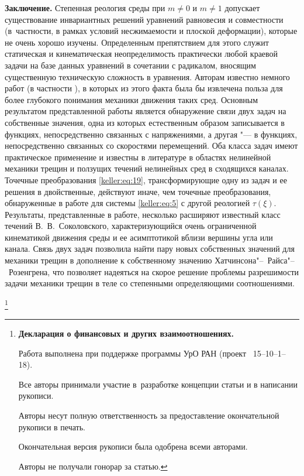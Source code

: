 {\bf Заключение.} Степенная реология среды при $m\neq0$ и $m\neq1$ допускает существование инвариантных решений уравнений равновесия и совместности (в~частности, в рамках условий несжимаемости и плоской деформации), которые не очень хорошо изучены. Определенным препятствием для этого служит статическая и кинематическая неопределимость практически любой краевой задачи на базе данных уравнений в сочетании с радикалом, вносящим существенную техническую сложность в уравнения. Авторам известно немного работ (в частности \cite{keller:bib:Dush}), в которых из этого факта была бы извлечена польза для более глубокого понимания механики движения таких сред. Основным результатом представленной работы является обнаружение связи двух задач на собственные значения, одна из которых естественным образом записывается в функциях, непосредственно связанных с напряжениями, а другая "--- в функциях, непосредственно связанных со скоростями перемещений. Оба класса задач имеют практическое применение и известны в литературе в областях нелинейной механики трещин и ползущих течений нелинейных сред в сходящихся каналах. Точечные преобразования \eqref{keller:eq:19}, трансформирующие одну из задач и ее решения в двойственные, действуют иначе, чем точечные преобразования, обнаруженные в работе \cite{keller:bib:Kel} для системы \eqref{keller:eq:5} с другой реологией $\tau(\xi).$ Результаты, представленные в работе, несколько расширяют известный класс течений В.~В.~Соколовского, характеризующийся очень ограниченной кинематикой движения среды и ее асимптотикой вблизи вершины угла или канала. Связь двух задач позволила найти пару новых собственных значений для механики трещин в дополнение к собственному значению Хатчинсона"--~Райса"--~Розенгрена, что позволяет надеяться на скорое решение проблемы разрешимости задачи механики трещин в теле со степенными определяющими соотношениями.   









\thanks{{\bf Декларация о финансовых и других взаимоотношениях.}

Работа выполнена при поддержке программы УрО РАН (проект \No~15--10--1--18).

Все  авторы  принимали  участие  в~разработке  концепции  \mbox{статьи}  и  в  написании  рукописи. 

Авторы несут  полную  ответственность  за  предоставление  окончательной рукописи в печать.

Окончательная  версия рукописи была одобрена всеми авторами.

Авторы не получали гонорар за статью.

}





